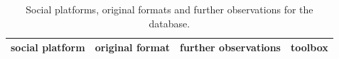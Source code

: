 																																																																																																																																																																																																																																																																																																																																																																																																															\begin{table}[h!]\scriptsize
																																																																																																																																																																																																																																																																																																																																																																																																																\begin{center}
																																																																																																																																																																																																																																																																																																																																																																																																																		\caption{Social platforms, original formats and further observations for
																																																																																																																																																																																																																																																																																																																																																																																																																				the database.}\label{tab:provenance}
																																																																																																																																																																																																																																																																																																																																																																																																																						\begin{tabular}{| l || p{3cm} | p{3cm} | c |}\hline
																																																																																																																																																																																																																																																																																																																																																																																																																									\textbf{social platform} & \textbf{original format} & \textbf{further observations} & \textbf{toolbox} \\\hline\hline

\end{tabular}
\end{center}
\end{table}
